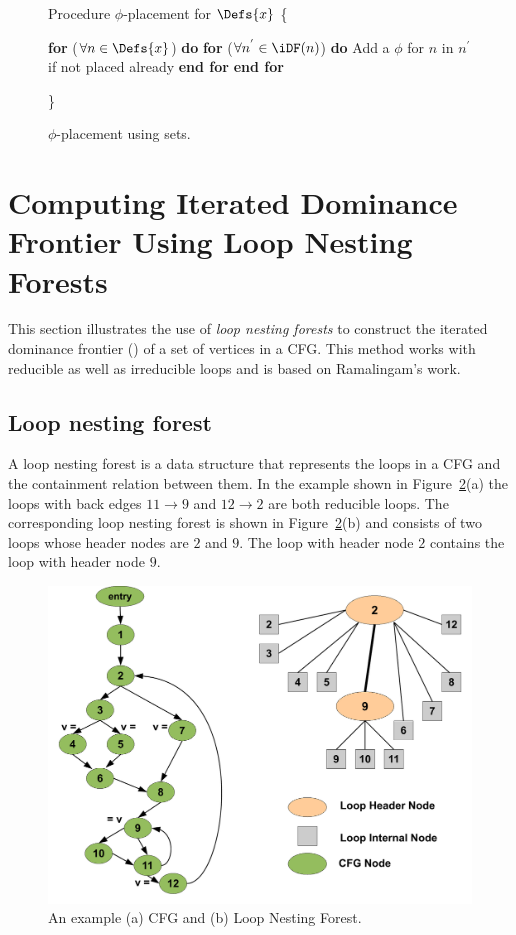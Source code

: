 {\begin{figure}[!ht]
\begin{minipage}[t]{5in}
\setcounter{linectr}{0}

Procedure $\phi$-placement for $\Defs{x}$
\{
\begin{code}
 {\bf for} ($\forall n \in \Defs{x}$) {\bf do}
   {\bf for} ($\forall n^{'} \in \iDF(n)$) {\bf do}
       Add a $\phi$ for $n$ in $n^{'}$ if not placed already
   {\bf end for}
 {\bf end for}
\end{code}
\}
\end{minipage}
\caption{$\phi$-placement using \iDF sets.}
\label{F:phip}
\end{figure} 


\section{Computing Iterated Dominance Frontier Using Loop Nesting Forests}
\label{section:alternative_ssa_construction_algorithms:loop}
This section illustrates the use of \emph{loop nesting forests} to construct 
the iterated dominance frontier (\iDF) of a set of vertices in a CFG. This 
method works with reducible as well as irreducible loops and is based on 
Ramalingam's work.


\subsection{Loop nesting forest}
A loop nesting forest is a data structure that represents the loops in a CFG and the containment relation between them. 
In the example shown in Figure~\ref{fig:lnf}(a) the loops with back edges $11 \rightarrow 9$ and $12 \rightarrow 2$ are both reducible loops. 
The corresponding loop nesting forest is shown in Figure~\ref{fig:lnf}(b) and consists of two loops whose header nodes are $2$ and $9$. 
The loop with header node $2$ contains the loop with header node $9$.

    \begin{figure}[htb]
    \centerline{\includegraphics[scale=0.3]{lnfred.pdf}}
    \caption{An example (a) CFG and (b) Loop Nesting Forest.}
    \label{fig:lnf}
    \end{figure} 


}
